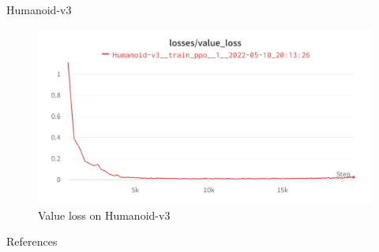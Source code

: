 \documentclass[english, xcolor=dvipsnames, aspectratio=169]{beamer}
\begin{document}
\begin{frame}{Humanoid-v3}
\begin{figure}[ht]
        \begin{minipage}[b]{0.32\linewidth}
            \centering
            \includegraphics[width=\textwidth]{humanoid_value_loss.png}
            \caption{Value loss on Humanoid-v3}
            \label{fig:imagenet1k}
        \end{minipage}
    \end{figure}
\end{frame}

\begin{frame}{References}


\end{frame}
\end{document}
